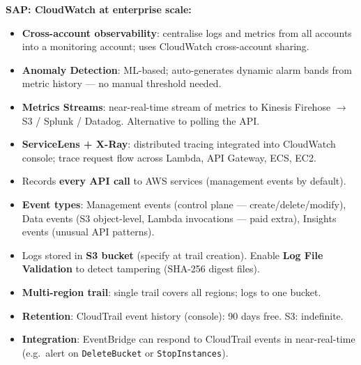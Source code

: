 \begin{sapdepth}
\textbf{SAP: CloudWatch at enterprise scale:}
\begin{itemize}
  \item \textbf{Cross-account observability}: centralise logs and metrics from all accounts
        into a monitoring account; uses CloudWatch cross-account sharing.
  \item \textbf{Anomaly Detection}: ML-based; auto-generates dynamic alarm bands from
        metric history --- no manual threshold needed.
  \item \textbf{Metrics Streams}: near-real-time stream of metrics to Kinesis Firehose
        $\rightarrow$ S3 / Splunk / Datadog. Alternative to polling the API.
  \item \textbf{ServiceLens + X-Ray}: distributed tracing integrated into CloudWatch console;
        trace request flow across Lambda, API Gateway, ECS, EC2.
\end{itemize}
\end{sapdepth}



\begin{keyfacts}
\begin{itemize}
  \item Records \textbf{every API call} to AWS services (management events by default).
  \item \textbf{Event types}: Management events (control plane --- create/delete/modify),
        Data events (S3 object-level, Lambda invocations --- paid extra),
        Insights events (unusual API patterns).
  \item Logs stored in \textbf{S3 bucket} (specify at trail creation). Enable \textbf{Log File
        Validation} to detect tampering (SHA-256 digest files).
  \item \textbf{Multi-region trail}: single trail covers all regions; logs to one bucket.
  \item \textbf{Retention}: CloudTrail event history (console): 90 days free. S3: indefinite.
  \item \textbf{Integration}: EventBridge can respond to CloudTrail events in near-real-time
        (e.g.\ alert on \texttt{DeleteBucket} or \texttt{StopInstances}).
\end{itemize}
\end{keyfacts}


